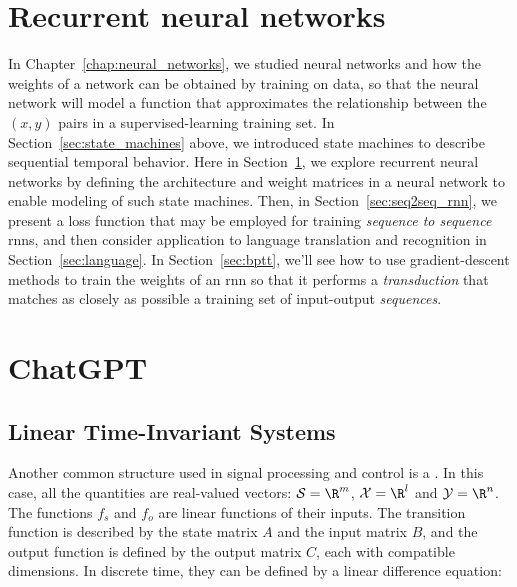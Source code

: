     


\section{Recurrent neural networks}
\label{sec:rnn_model}

In Chapter~\ref{chap:neural_networks}, we studied neural networks and
how the weights of a network can be obtained by training on data, so
that the neural network will model a function that approximates the
relationship between the $(x, y)$ pairs in a supervised-learning
training set.  In Section~\ref{sec:state_machines} above, we
introduced state machines to describe sequential temporal
behavior. Here in Section~\ref{sec:rnn_model}, we explore recurrent
neural networks by defining the architecture and weight matrices in a
neural network to enable modeling of such state machines.  Then, in
Section~\ref{sec:seq2seq_rnn}, we present a loss function that may be
employed for training {\em sequence to sequence} {\sc rnn}s, and then
consider application to language translation and recognition in
Section~\ref{sec:language}.  In Section~\ref{sec:bptt}, we'll see how
to use gradient-descent methods to train the weights of an {\sc rnn}
so that it performs a {\em transduction} that matches as closely as
possible a training set of input-output {\em sequences}.



\section{ChatGPT}
    
    \subsection{Linear Time-Invariant Systems}
    
    Another common structure used in signal processing and control is a . In this case, all the quantities are real-valued vectors: $\mathcal S = \R^m$, $\mathcal X = \R^l$ and $\mathcal Y = \R^n$. The functions $f_s$ and $f_o$ are linear functions of their inputs. The transition function is described by the state matrix $A$ and the input matrix $B$, and the output function is defined by the output matrix $C$, each with compatible dimensions. In discrete time, they can be defined by a linear difference equation:
    
